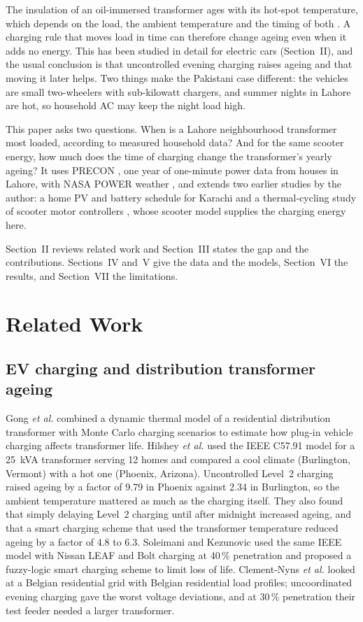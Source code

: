 \documentclass[conference]{IEEEtran}
\begin{document}
The insulation of an oil-immersed transformer ages with its hot-spot
temperature, which depends on the load, the ambient temperature and the
timing of both \cite{iec60076}. A charging rule that moves load in time can
therefore change ageing even when it adds no energy. This has been studied in
detail for electric cars (Section~II), and the usual conclusion is that
uncontrolled evening charging raises ageing and that moving it later helps.
Two things make the Pakistani case different: the vehicles are small
two-wheelers with sub-kilowatt chargers, and summer nights in Lahore are hot,
so household AC may keep the night load high.

This paper asks two questions. When is a Lahore neighbourhood transformer
most loaded, according to measured household data? And for the same scooter
energy, how much does the time of charging change the transformer's yearly
ageing? It uses PRECON \cite{precon}, one year of one-minute power data from
houses in Lahore, with NASA POWER weather \cite{nasapower}, and extends two
earlier studies by the author: a home PV and battery schedule for Karachi
\cite{gillaniA} and a thermal-cycling study of scooter motor controllers
\cite{gillani2}, whose scooter model supplies the charging energy here.

Section~II reviews related work and Section~III states the gap and the
contributions. Sections~IV and~V give the data and the models,
Section~VI the results, and Section~VII the limitations.

\section{Related Work}
\subsection{EV charging and distribution transformer ageing}
Gong \emph{et al.} \cite{gong2012} combined a dynamic thermal model of a
residential distribution transformer with Monte Carlo charging scenarios to
estimate how plug-in vehicle charging affects transformer life. Hilshey \emph{et al.} \cite{hilshey2013} used the IEEE C57.91
model for a 25~kVA transformer serving 12 homes and compared a cool climate
(Burlington, Vermont) with a hot one (Phoenix, Arizona). Uncontrolled Level~2
charging raised ageing by a factor of 9.79 in Phoenix against 2.34 in
Burlington, so the ambient temperature mattered as much as the charging
itself. They also found that simply delaying Level~2 charging until after
midnight increased ageing, and that a smart charging scheme that used the transformer temperature reduced
ageing by a factor of 4.8 to 6.3. Soleimani and Kezunovic \cite{soleimani2020}
used the same IEEE model with Nissan LEAF and Bolt charging at 40\,\%
penetration and proposed a fuzzy-logic smart charging scheme to limit loss of
life. Clement-Nyns \emph{et al.} \cite{clementnyns2010} looked at a Belgian
residential grid with Belgian residential load profiles; uncoordinated evening charging
gave the worst voltage deviations, and at 30\,\% penetration their test feeder
needed a larger transformer.
\end{document}
